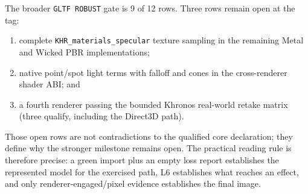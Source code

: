 The broader \texttt{GLTF ROBUST} gate is 9 of 12 rows. Three rows remain open at the tag:

\begin{enumerate}
  \item complete \texttt{KHR\_materials\_specular} texture sampling in the remaining Metal and
        Wicked PBR implementations;
  \item native point/spot light terms with falloff and cones in the cross-renderer shader ABI; and
  \item a fourth renderer passing the bounded Khronos real-world retake matrix (three qualify,
        including the Direct3D path).
\end{enumerate}

Those open rows are not contradictions to the qualified core declaration; they define why the
stronger milestone remains open. The practical reading rule is therefore precise: a green import
plus an empty loss report establishes the represented model for the exercised path, L6 establishes
what reaches an effect, and only renderer-engaged/pixel evidence establishes the final image.

